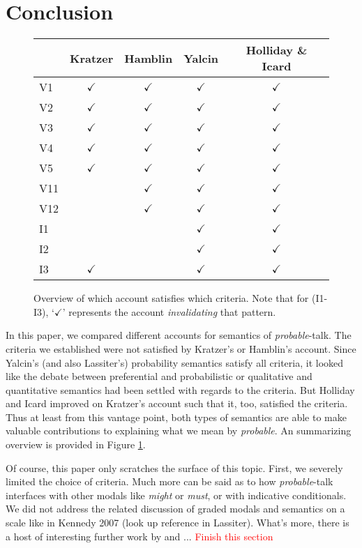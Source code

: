 \documentclass{article}
\theoremstyle{definition}
\newcommand\todo[1]{\textcolor{red}{#1}}
\begin{document}
\section{Conclusion}
\begin{figure}
\begin{center}
\begin{tabular}{lcccc}
 & Kratzer & Hamblin & Yalcin & Holliday \& Icard\\
\hline
V1 & \(\checkmark\) & \(\checkmark\) & \(\checkmark\) & \(\checkmark\)\\
V2 & \(\checkmark\) & \(\checkmark\) & \(\checkmark\) & \(\checkmark\)\\
V3 & \(\checkmark\) & \(\checkmark\) & \(\checkmark\) & \(\checkmark\)\\
V4 & \(\checkmark\) & \(\checkmark\) & \(\checkmark\) & \(\checkmark\)\\
V5 & \(\checkmark\) & \(\checkmark\) & \(\checkmark\) & \(\checkmark\)\\
\hline
V11 & \texttimes{} & \(\checkmark\) & \(\checkmark\) & \(\checkmark\)\\
V12 & \texttimes{} & \(\checkmark\) & \(\checkmark\) & \(\checkmark\)\\
\hline
I1 & \texttimes{} & \texttimes{} & \(\checkmark\) & \(\checkmark\)\\
I2 & \texttimes{} & \texttimes{} & \(\checkmark\) & \(\checkmark\)\\
I3 & \(\checkmark\) & \texttimes{} & \(\checkmark\) & \(\checkmark\)\\
\end{tabular}
\end{center}
\caption{Overview of which account satisfies which criteria. Note that for
  (I1-I3), `$\checkmark$' represents the account \emph{invalidating} that pattern.}
\label{fig:table}
\end{figure}
In this paper, we compared different accounts for semantics of
\emph{probable}-talk. The criteria we established were not satisfied by
Kratzer's or Hamblin's account. Since Yalcin's (and also Lassiter's) probability
semantics satisfy all criteria, it looked like the debate between preferential
and probabilistic or qualitative and quantitative semantics had been settled
with regards to the criteria. But Holliday and Icard improved on Kratzer's
account such that it, too, satisfied the criteria. Thus at least from this
vantage point, both types of semantics are able to make valuable contributions
to explaining what we mean by \emph{probable}. An summarizing overview is
provided in Figure \ref{fig:table}. 

Of course, this paper only scratches the surface of this topic. First, we
severely limited the choice of criteria. Much more can be said as to how
\emph{probable}-talk interfaces with other modals like \emph{might} or
\emph{must}, or with indicative conditionals. We did not address the related
discussion of graded modals and semantics on a scale like in Kennedy 2007 (look
up reference in Lassiter). What's more, there is a host of interesting further
work by \textcite{holliday13_measur} and \textcite{harrison-trainor17_prefer} ...
\todo{Finish this section}

 \printbibliography
\end{document}
